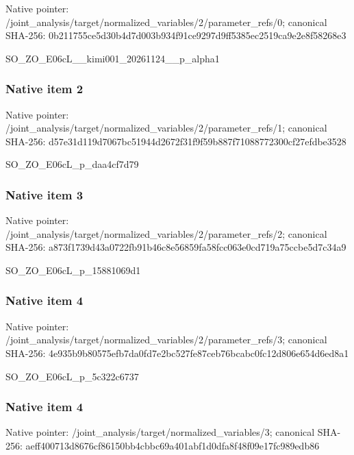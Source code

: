 \documentclass[10pt,a4paper]{article}
\begin{document}
Native pointer: /joint\_analysis/target/n\allowbreak{}ormalized\_variables/2/pa\allowbreak{}rameter\_refs/0; canonical SHA-256: 0b211755ce5d30b4d7d003b9\allowbreak{}34f91ce9297d9ff5385ec251\allowbreak{}9ca9e2e8f58268e3


SO\_ZO\_E06cL\_\_kimi001\_20261124\_\_p\_alpha1


\subsubsection{Native item 2}


Native pointer: /joint\_analysis/target/n\allowbreak{}ormalized\_variables/2/pa\allowbreak{}rameter\_refs/1; canonical SHA-256: d57e31d119d7067bc51944d2\allowbreak{}672f31f9f59b887f71088772\allowbreak{}300cf27efdbe3528


SO\_ZO\_E06cL\_p\_daa4cf7d79


\subsubsection{Native item 3}


Native pointer: /joint\_analysis/target/n\allowbreak{}ormalized\_variables/2/pa\allowbreak{}rameter\_refs/2; canonical SHA-256: a873f1739d43a0722fb91b46\allowbreak{}c8e56859fa58fcc063e0cd71\allowbreak{}9a75ccbe5d7c34a9


SO\_ZO\_E06cL\_p\_15881069d1


\subsubsection{Native item 4}


Native pointer: /joint\_analysis/target/n\allowbreak{}ormalized\_variables/2/pa\allowbreak{}rameter\_refs/3; canonical SHA-256: 4e935b9b80575efb7da0fd7e\allowbreak{}2bc527fe87ceb76bcabc0fc1\allowbreak{}2d806e654d6ed8a1


SO\_ZO\_E06cL\_p\_5c322c6737


\subsubsection{Native item 4}


Native pointer: /joint\_analysis/target/n\allowbreak{}ormalized\_variables/3; canonical SHA-256: aeff400713d8676cf86150bb\allowbreak{}4cbbc69a401abf1d0dfa8f48\allowbreak{}f09e17fc989edb86
\end{document}
